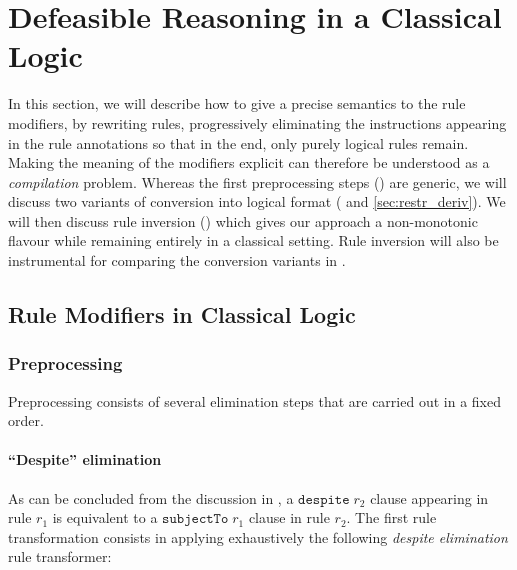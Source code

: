 \section{Defeasible Reasoning in a Classical Logic}\label{sec:defeasible_classical}

In this section, we will describe how to give a precise semantics to the rule
modifiers, by rewriting rules, progressively eliminating the instructions
appearing in the rule annotations so that in the end, only purely logical
rules remain. Making the meaning of the modifiers explicit can therefore be
understood as a \emph{compilation} problem.  Whereas the first preprocessing
steps () are generic, we will discuss two variants
of conversion into logical format ( and
\ref{sec:restr_deriv}). We will then discuss rule inversion
() which gives our approach a non-monotonic flavour
while remaining entirely in a classical setting. Rule inversion will also be
instrumental for comparing the conversion variants in .


\subsection{Rule Modifiers in Classical Logic}\label{sec:rule_modifiers_in_classical_logic}

\subsubsection{Preprocessing}\label{sec:preprocessing}

Preprocessing consists of several elimination steps that are carried out in a
fixed order.

\paragraph{\textbf{``Despite''  elimination}}

As can be concluded from the discussion in , a
$\mathtt{despite}\; r_2$ clause appearing in rule $r_1$ is equivalent to a
$\mathtt{subjectTo}\; r_1$ clause in rule $r_2$. The first rule transformation
consists in applying exhaustively the following \emph{despite elimination}
rule transformer:

